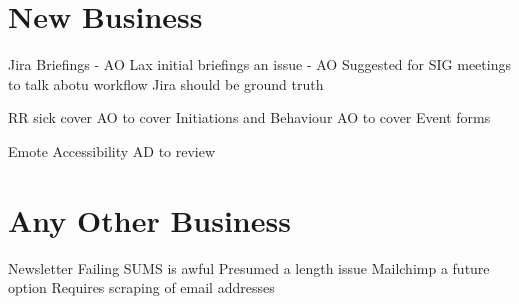\documentclass[11pt,hacksoc]{meetingmins}
\begin{document}
\section{New Business}
\begin{items}
\item Jira Briefings - AO
  \subitem Lax initial briefings an issue - AO
  \subitem Suggested for SIG meetings to talk abotu workflow
  \subitem Jira should be ground truth
\item RR sick cover
  \subitem AO to cover Initiations and Behaviour
  \subitem AO to cover Event forms
\item Emote Accessibility
  \subitem AD to review
\end{items}

\section{Any Other Business}
\begin{items}
\item Newsletter Failing
  \subitem SUMS is awful
  \subitem Presumed a length issue
  \subitem Mailchimp a future option
    \subsubitem Requires scraping of email addresses
\end{items}

\vspace{1em}
\end{document}
